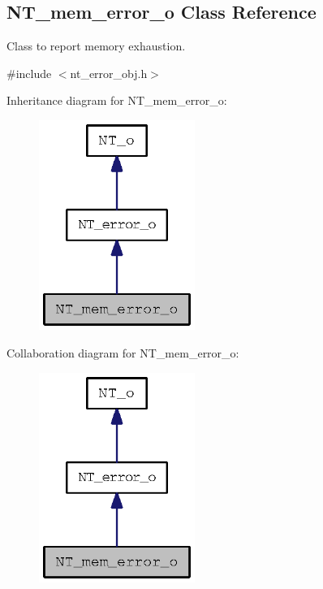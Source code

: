 \subsection{NT\_\-mem\_\-error\_\-o Class Reference}
\label{class_n_t__mem__error__o}


Class to report memory exhaustion.  




{\ttfamily \#include $<$nt\_\-error\_\-obj.h$>$}



Inheritance diagram for NT\_\-mem\_\-error\_\-o:
\nopagebreak
\begin{figure}[H]
\begin{center}
\leavevmode
\includegraphics[width=144pt]{class_n_t__mem__error__o__inherit__graph}
\end{center}
\end{figure}


Collaboration diagram for NT\_\-mem\_\-error\_\-o:
\nopagebreak
\begin{figure}[H]
\begin{center}
\leavevmode
\includegraphics[width=144pt]{class_n_t__mem__error__o__coll__graph}
\end{center}
\end{figure}
